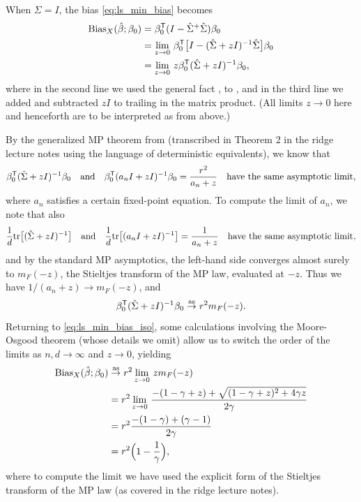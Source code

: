 \documentclass{article}
\begin{document}
When $\Sigma = I$, the bias \eqref{eq:ls_min_bias} becomes 
\begin{align}
\nonumber
\mathrm{Bias}_X(\hat{\beta}; \beta_0) 
&= \beta_0^{\mathsf{T}} (I - \hat\Sigma^+ \hat\Sigma) \beta_0 \\ 
\nonumber
&= \lim_{z \to 0} \, \beta_0^{\mathsf{T}} \big[ I - (\hat\Sigma + zI)^{-1} \hat\Sigma \big]
  \beta_0 \\   
\label{eq:ls_min_bias_iso}
&= \lim_{z \to 0} \, z \beta_0^{\mathsf{T}} (\hat\Sigma + zI)^{-1} \beta_0, 
\end{align}
where in the second line we used the general fact , to , and 
in the third line we added and subtracted $zI$ to trailing \smash{$\hSigma$} in
the matrix product. (All limits $z \to 0$ here and henceforth are to be
interpreted as from above.)

By the generalized MP theorem from \citet{rubio2011spectral} (transcribed in
Theorem 2 in the ridge lecture notes using the language of deterministic
equivalents), we know that  
\[
\beta_0^{\mathsf{T}} (\hat\Sigma + zI)^{-1} \beta_0 \quad \text{and} \quad 
\beta_0^{\mathsf{T}} (a_n I + zI)^{-1} \beta_0 = \frac{r^2}{a_n + z} \quad
\text{have the same asymptotic limit},
\]
where $a_n$ satisfies a certain fixed-point equation. To compute the limit of
$a_n$, we note that also
\[
\frac{1}{d} \mathrm{tr} \big[ (\hat\Sigma + zI)^{-1} \big] \quad \text{and} \quad 
\frac{1}{d} \mathrm{tr} \big[ (a_n I + zI)^{-1} \big] = \frac{1}{a_n + z}
\quad \text{have the same asymptotic limit},  
\]
and by the standard MP asymptotics, the left-hand side converges almost surely
to $m_F(-z)$, the Stieltjes transform of the MP law, evaluated at $-z$. Thus we
have $1/(a_n + z) \to m_F(-z)$, and   
\[
\beta_0^{\mathsf{T}} (\hat\Sigma + zI)^{-1} \beta_0 \overset{\mathrm{as}}{\to} r^2 m_F(-z).
\]
Returning to \eqref{eq:ls_min_bias_iso}, some calculations involving the
Moore-Osgood theorem (whose details we omit) allow us to switch the order of the
limits as $n,d \to \infty$ and $z \to 0$, yielding
\begin{align}
\nonumber
\mathrm{Bias}_X(\hat{\beta}; \beta_0) &\overset{\mathrm{as}}{\to} r^2 \lim_{z \to 0} \, z m_F(-z) \\
\nonumber
&= r^2 \lim_{z \to 0} \, \frac{-(1 - \gamma + z) + \sqrt{(1 - \gamma + z)^2 +
  4 \gamma z}}{2 \gamma} \\
\nonumber
&= r^2 \frac{-(1-\gamma) + (\gamma-1)}{2 \gamma} \\
\label{eq:ls_min_bias_iso_limit}
&= r^2 \Big( 1- \frac{1}{\gamma} \Big),
\end{align}
where to compute the limit we have used the explicit form of the Stieltjes
transform of the MP law (as covered in the ridge lecture notes).
\end{document}
